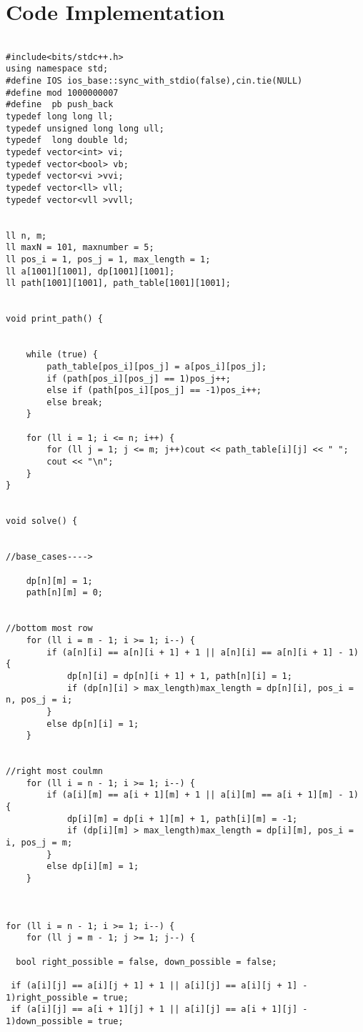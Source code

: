 \documentclass[10pt]{article}
\begin{document}
\section*{Code Implementation}
\begin{lstlisting}

#include<bits/stdc++.h>
using namespace std;
#define IOS ios_base::sync_with_stdio(false),cin.tie(NULL)
#define mod 1000000007
#define  pb push_back
typedef long long ll;
typedef unsigned long long ull;
typedef  long double ld;
typedef vector<int> vi;
typedef vector<bool> vb;
typedef vector<vi >vvi;
typedef vector<ll> vll;
typedef vector<vll >vvll;


ll n, m;
ll maxN = 101, maxnumber = 5;
ll pos_i = 1, pos_j = 1, max_length = 1;
ll a[1001][1001], dp[1001][1001];
ll path[1001][1001], path_table[1001][1001];


void print_path() {


	while (true) {
		path_table[pos_i][pos_j] = a[pos_i][pos_j];
		if (path[pos_i][pos_j] == 1)pos_j++;
		else if (path[pos_i][pos_j] == -1)pos_i++;
		else break;
	}

	for (ll i = 1; i <= n; i++) {
		for (ll j = 1; j <= m; j++)cout << path_table[i][j] << " ";
		cout << "\n";
	}
}


void solve() {


//base_cases---->

	dp[n][m] = 1;
	path[n][m] = 0;


//bottom most row
	for (ll i = m - 1; i >= 1; i--) {
		if (a[n][i] == a[n][i + 1] + 1 || a[n][i] == a[n][i + 1] - 1) {
			dp[n][i] = dp[n][i + 1] + 1, path[n][i] = 1;
			if (dp[n][i] > max_length)max_length = dp[n][i], pos_i = n, pos_j = i;
		}
		else dp[n][i] = 1;
	}


//right most coulmn
	for (ll i = n - 1; i >= 1; i--) {
		if (a[i][m] == a[i + 1][m] + 1 || a[i][m] == a[i + 1][m] - 1) {
			dp[i][m] = dp[i + 1][m] + 1, path[i][m] = -1;
			if (dp[i][m] > max_length)max_length = dp[i][m], pos_i = i, pos_j = m;
		}
		else dp[i][m] = 1;
	}



for (ll i = n - 1; i >= 1; i--) {
	for (ll j = m - 1; j >= 1; j--) {

  bool right_possible = false, down_possible = false;

 if (a[i][j] == a[i][j + 1] + 1 || a[i][j] == a[i][j + 1] - 1)right_possible = true;
 if (a[i][j] == a[i + 1][j] + 1 || a[i][j] == a[i + 1][j] - 1)down_possible = true;


\end{lstlisting}
\end{document}
